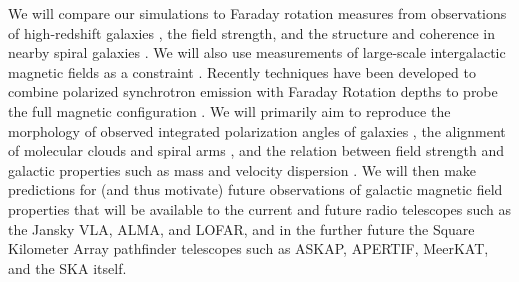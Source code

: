 We will compare our simulations to Faraday rotation measures from
observations of high-redshift galaxies
\cite{2008Natur.454..302B,2008ApJ...676...70K,1998A&A...329..809A},
the field strength, and the  structure and coherence in nearby 
spiral galaxies
\cite{2014arXiv1411.1386V}.  We will also use measurements of
large-scale intergalactic magnetic fields as a constraint
\cite{2010Sci...328...73N}.   
Recently techniques have been developed to combine polarized synchrotron
emission with Faraday Rotation depths to probe the full magnetic configuration
\citep{Heald09, Mao15}.
We will primarily aim to reproduce the morphology of observed integrated
polarization angles of galaxies \citep{Stil09}, the alignment of molecular
clouds and spiral arms \citep{2011Natur.479..499L}, and the relation between
field strength and galactic properties such as mass and velocity dispersion
\citep{2014arXiv1411.1386V,Tabatabaei16}.
We will then make predictions for (and thus
motivate) future observations of galactic magnetic field properties that will be
available to the current and future radio telescopes such as the Jansky VLA, ALMA, and LOFAR, and in the
further future the Square Kilometer Array pathfinder telescopes such
as ASKAP, APERTIF, MeerKAT, and
the SKA itself.


